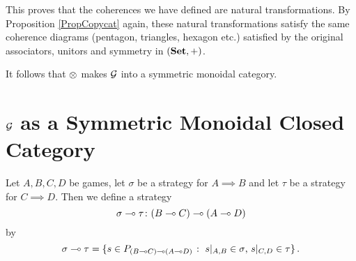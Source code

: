 This proves that the coherences we have defined are natural transformations.  
By Proposition \ref{PropCopycat} again, these natural transformations satisfy the same coherence diagrams (pentagon, triangles, hexagon etc.) satisfied by the original associators, unitors and symmetry in $({\normalfont\textbf{Set}},+)$.  

It follows that $\otimes$ makes $\mathcal G$ into a symmetric monoidal category.

\section{$\mathcal G$ as a Symmetric Monoidal Closed Category}

\begin{definition}
  Let $A,B,C,D$ be games, let $\sigma$ be a strategy for $A\implies B$ and let $\tau$ be a strategy for $C\implies D$.  
  Then we define a strategy 
  \[
    \sigma\multimap \tau\colon (B\multimap C) \multimap (A\multimap D)
    \]
  by
  \[
    \sigma\multimap \tau = \{s\in P_{(B\multimap C) \multimap (A \multimap D)}\;\colon\; \text{$s\vert_{A,B}\in\sigma$, $s\vert_{C,D}\in\tau$}\}\,.
    \]
\end{definition}

